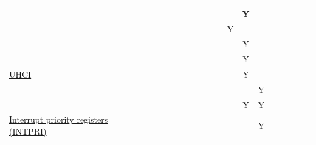 \documentclass[main\_\_EN.tex]{subfiles}
\begin{document}
\begin{landscape}
\begin{tiny}
\begin{longtable}[c]{|m{2.1cm}|c|c|c|c|c|c|c|c|c|C{1.4cm}|c|c|c|c|c|c|c|c|c| }
     &  &  &  &  &  &  &  &  &  &  &  &  & Y &  &  &  &  &  &  \\ \hline
     &  &  &  &  &  &  &  &  &  &  &  & Y &  &  &  &  &  &  &  \\ \hline
     &  &  &  &  &  &  &  &  &  &  &  &  & Y &  &  &  &  &  &  \\ \hline
     &  &  &  &  &  &  &  &  &  &  &  &  & Y &  &  &  &  &  &  \\ \hline
    \hyperref[mod:uart]{UHCI} &  &  &  &  &  &  &  &  &  &  &  &  & Y &  &  &  &  &  &  \\ \hline
     &  &  &  &  &  &  &  &  &  &  &  &  &  & Y &  &  &  &  &  \\ \hline
      &  &  &  &  &  &  &  &  &  &  &  &  & Y & Y &  &  &  &  &  \\ \hline
    \hyperref[mod:riscvcpu]{Interrupt priority registers (INTPRI)} &  &  &  &  &  &  &  &  &  &  &  &  &  & Y &  &  &  &  &  \\ \hline
\end{longtable}

\begin{longtable}[c]{|m{1.6cm}|c|c|c|c|c|c|c|c|c|C{1.5cm}|c|c|c|c|c|c|c|c|c| }


\end{longtable}
\end{tiny}
\end{landscape}
\end{document}
